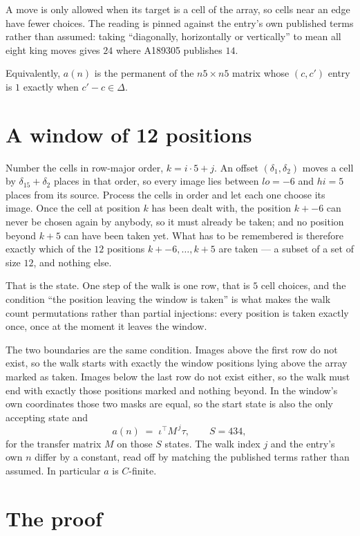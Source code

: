 \documentclass[11pt,a4paper]{article}
\theoremstyle{plain}
\theoremstyle{definition}
\begin{document}
A move is only allowed when its target is a cell of the array, so cells near an
edge have fewer choices. The reading is pinned against the entry's own published terms rather
than assumed: taking ``diagonally, horizontally or vertically'' to mean all eight king moves
gives $24$ where A189305 publishes $14$.

Equivalently, $a(n)$ is the permanent of the $n5\times n5$ matrix whose $(c,c')$ entry is
$1$ exactly when $c'-c\in\Delta$.

\section{A window of 12 positions}

Number the cells in row-major order, $k=i\cdot5+j$. An offset $(\delta_1,\delta_2)$ moves a
cell by $\delta_15+\delta_2$ places in that order, so every image lies between $lo=-6$ and
$hi=5$ places from its source. Process the cells in order and let each one choose its image.
Once the cell at position $k$ has been dealt with, the position $k+-6$ can never be chosen
again by anybody, so it must already be taken; and no position beyond $k+5$ can have been
taken yet. What has to be remembered is therefore exactly which of the $12$ positions
$k+-6,\dots,k+5$ are taken --- a subset of a set of size $12$, and nothing else.

That is the state. One step of the walk is one row, that is $5$ cell choices, and the
condition ``the position leaving the window is taken'' is what makes the walk count permutations
rather than partial injections: every position is taken exactly once, once at the moment it
leaves the window.

The two boundaries are the same condition. Images above the first row do not exist, so the walk
starts with exactly the window positions lying above the array marked as taken. Images below the
last row do not exist either, so the walk must end with exactly those positions marked and
nothing beyond. In the window's own coordinates those two masks are equal, so the start state is
also the only accepting state and
\[
a(n)\;=\;\iota^{\!\top}M^{\,j}\tau ,\qquad S=434,
\]
for the transfer matrix $M$ on those $S$ states. The walk index $j$ and the entry's own $n$
differ by a constant, read off by matching the published terms rather than assumed. In
particular $a$ is $C$-finite.

\section{The proof}
\end{document}
